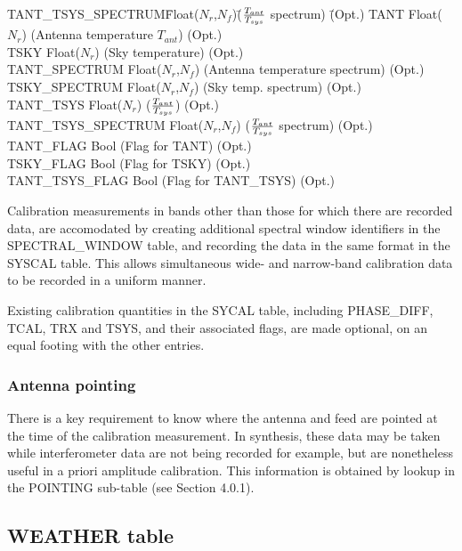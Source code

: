 \documentclass{article}
\newcommand{\nr}{$N_r$}
\newcommand{\nf}{$N_f$}
\begin{document}
\begin{itemize}
\begin{tabbing}
TANT\_TSYS\_SPECTRUM\quad\quad \= Float(\nr,\nf)\quad\quad \=
(${{T_{ant}}\over{T_{sys}}}$ spectrum)
\quad\quad\quad\quad\quad\quad\quad\quad\quad 
\= (Opt.) \kill
TANT \> Float(\nr) \> (Antenna temperature $T_{ant}$) \> (Opt.) \\
TSKY \> Float(\nr) \> (Sky temperature) \> (Opt.) \\
TANT\_SPECTRUM   \> Float(\nr,\nf)  \> 
(Antenna temperature spectrum) \> (Opt.) \\
TSKY\_SPECTRUM \> Float(\nr,\nf) \> (Sky temp. spectrum) \> (Opt.) \\
TANT\_TSYS     \> Float(\nr) \>
(${{T_{ant}}\over{T_{sys}}}$) \> (Opt.) \\
TANT\_TSYS\_SPECTRUM     \> Float(\nr,\nf) \>
(${{T_{ant}}\over{T_{sys}}}$ spectrum) \> (Opt.) \\
TANT\_FLAG     \> Bool \>
(Flag for TANT) \> (Opt.) \\
TSKY\_FLAG \> Bool \> (Flag for TSKY) \> (Opt.) \\
TANT\_TSYS\_FLAG     \> Bool \>
(Flag for TANT\_TSYS) \> (Opt.) \\
\end{tabbing}

 Calibration measurements in bands other than those for which there
are recorded data, are accomodated by creating additional spectral
window identifiers in the SPECTRAL\_WINDOW table, and recording the
data in the same format in the SYSCAL table. This allows simultaneous
wide- and narrow-band calibration data to be recorded in a uniform manner.

 Existing calibration quantities in the SYCAL table, including
PHASE\_DIFF, TCAL, TRX and TSYS, and their associated flags, are made
optional, on an equal footing with the other entries.


\subsubsection{Antenna pointing}

There is a key requirement to know where the antenna and feed are
pointed at the time of the calibration measurement. In synthesis,
these data may be taken while interferometer data are not being
recorded for example, but are nonetheless useful in a priori amplitude
calibration. This information is obtained by lookup in the POINTING
sub-table (see Section 4.0.1).

\subsection{WEATHER table}


\end{itemize}
\end{document}
